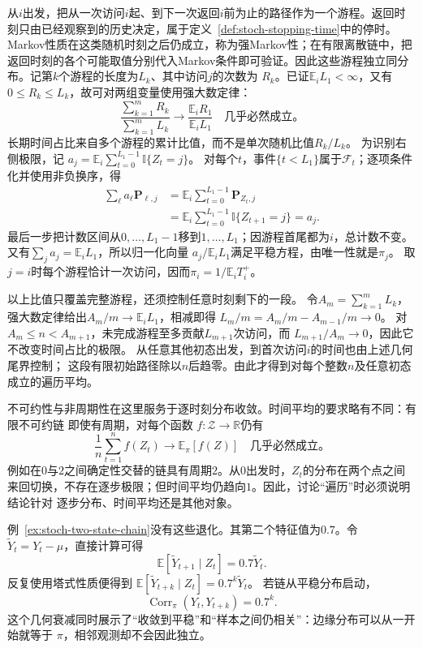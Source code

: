 从$i$出发，把从一次访问$i$起、到下一次返回$i$前为止的路径作为一个游程。返回时刻只由已经观察到的历史决定，属于定义~\ref{def:stoch-stopping-time}中的停时。Markov性质在这类随机时刻之后仍成立，称为强Markov性；在有限离散链中，把返回时刻的各个可能取值分别代入Markov条件即可验证。因此这些游程独立同分布。记第$k$个游程的长度为$L_k$、其中访问$j$的次数为
$R_k$。已证$\mathbb E_iL_1<\infty$，又有$0\leq R_k\leq L_k$，故可对两组变量使用强大数定律：
\[
  \frac{\sum_{k=1}^{m}R_k}{\sum_{k=1}^{m}L_k}
  \longrightarrow
  \frac{\mathbb{E}_iR_1}{\mathbb{E}_iL_1}
  \quad\text{几乎必然成立。}
\]
长期时间占比来自多个游程的累计比值，而不是单次随机比值$R_k/L_k$。
为识别右侧极限，记
$a_j=\mathbb E_i\sum_{t=0}^{L_1-1}\mathbb I\{Z_t=j\}$。
对每个$t$，事件$\{t<L_1\}$属于$\mathcal F_t$；逐项条件化并使用非负换序，得
\[
\begin{aligned}
 \sum_\ell a_\ell\bm P_{\ell,j}
 &=\mathbb E_i\sum_{t=0}^{L_1-1}\bm P_{Z_t,j}\\
 &=\mathbb E_i\sum_{t=0}^{L_1-1}\mathbb I\{Z_{t+1}=j\}
 =a_j.
\end{aligned}
\]
最后一步把计数区间从$0,\ldots,L_1-1$移到$1,\ldots,L_1$；因游程首尾都为$i$，总计数不变。
又有$\sum_j a_j=\mathbb E_iL_1$，所以归一化向量
$a_j/\mathbb E_iL_1$满足平稳方程，由唯一性就是$\pi_j$。
取$j=i$时每个游程恰计一次访问，因而$\pi_i=1/\mathbb E_iT_i^+$。

以上比值只覆盖完整游程，还须控制任意时刻剩下的一段。
令$A_m=\sum_{k=1}^mL_k$，强大数定律给出$A_m/m\to\mathbb E_iL_1$，相减即得
$L_m/m=A_m/m-A_{m-1}/m\to0$。
对$A_m\leq n<A_{m+1}$，未完成游程至多贡献$L_{m+1}$次访问，而
$L_{m+1}/A_m\to0$，因此它不改变时间占比的极限。
从任意其他初态出发，到首次访问$i$的时间也由上述几何尾界控制；
这段有限初始路径除以$n$后趋零。由此才得到对每个整数$n$及任意初态成立的遍历平均。

不可约性与非周期性在这里服务于逐时刻分布收敛。时间平均的要求略有不同：有限不可约链
即使有周期，对每个函数
$f:\mathcal{Z}\to\mathbb{R}$仍有
\begin{equation}
  \frac1n\sum_{t=1}^{n}f(Z_t)\longrightarrow\mathbb{E}_{\pi}[f(Z)]
  \quad\text{几乎必然成立。}
  \label{eq:stoch-markov-ergodic-average}
\end{equation}
例如在$0$与$2$之间确定性交替的链具有周期$2$。从$0$出发时，$Z_t$的分布在两个点之间
来回切换，不存在逐步极限；但时间平均仍趋向$1$。因此，讨论“遍历”时必须说明结论针对
逐步分布、时间平均还是其他对象。

例~\ref{ex:stoch-two-state-chain}没有这些退化。其第二个特征值为$0.7$。令
$\widetilde{Y}_t=Y_t-\mu$，直接计算可得
\begin{equation}
  \mathbb{E}[\widetilde{Y}_{t+1}\mid Z_t]=0.7\widetilde{Y}_t.
  \label{eq:stoch-two-state-eigenfunction}
\end{equation}
反复使用塔式性质便得到
$\mathbb{E}[\widetilde{Y}_{t+k}\mid Z_t]=0.7^k\widetilde{Y}_t$。
若链从平稳分布启动，
\begin{equation}
  \operatorname{Corr}_{\pi}(Y_t,Y_{t+k})=0.7^k.
  \label{eq:stoch-two-state-autocorrelation}
\end{equation}
这个几何衰减同时展示了“收敛到平稳”和“样本之间仍相关”：边缘分布可以从一开始就等于
$\pi$，相邻观测却不会因此独立。

